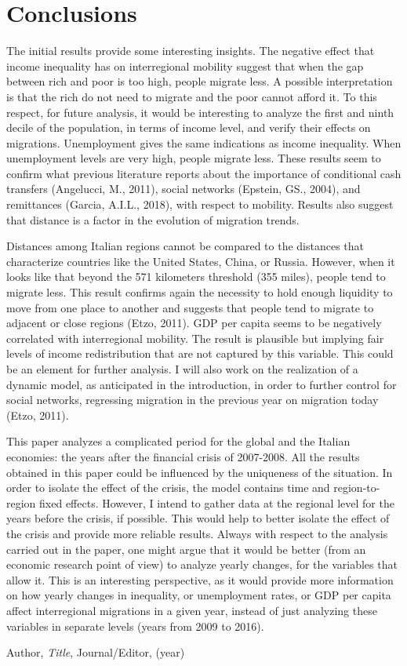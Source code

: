 \documentclass{article}
\theoremstyle{definition}
\theoremstyle{remark}
\begin{document}
 \section{Conclusions}
 The initial results provide some interesting insights. The negative effect that income inequality has on interregional mobility suggest that when the gap between rich and poor is too high, people migrate less. A possible interpretation is that the rich do not need to migrate and the poor cannot afford it. 
To this respect, for future analysis, it would be interesting to analyze the first and ninth decile of the population, in terms of income level, and verify their effects on migrations. Unemployment gives the same indications as income inequality. When unemployment levels are very high, people migrate less. These results seem to confirm what previous literature reports about the importance of conditional cash transfers (Angelucci, M., 2011), social networks (Epstein, GS., 2004), and remittances (Garcia, A.I.L., 2018), with respect to mobility. 
Results also suggest that distance is a factor in the evolution of migration trends. 

Distances among Italian regions cannot be compared to the distances that characterize countries like the United States, China, or Russia. However, when it looks like that beyond the 571 kilometers threshold (355 miles), people tend to migrate less. This result confirms again the necessity to hold enough liquidity to move from one place to another and suggests that people tend to migrate to adjacent or close regions (Etzo, 2011). 
GDP per capita seems to be negatively correlated with interregional mobility. The result is plausible but implying fair levels of income redistribution that are not captured by this variable. This could be an element for further analysis. 
I will also work on the realization of a dynamic model, as anticipated in the introduction, in order to further control for social networks, regressing migration in the previous year on migration today (Etzo, 2011). 

This paper analyzes a complicated period for the global and the Italian economies: the years after the financial crisis of 2007-2008. All the results obtained in this paper could be influenced by the uniqueness of the situation. In order to isolate the effect of the crisis, the model contains time and region-to-region fixed effects. However, I intend to gather data at the regional level for the years before the crisis, if possible. This would help to better isolate the effect of the crisis and provide more reliable results.
Always with respect to the analysis carried out in the paper, one might argue that it would be better (from an economic research point of view) to analyze yearly changes, for the variables that allow it. This is an interesting perspective, as it would provide more information on how yearly changes in inequality, or unemployment rates, or GDP per capita affect interregional migrations in a given year, instead of just analyzing these variables in separate levels (years from 2009 to 2016). 



\begin{thebibliography}{99}

 Author, \emph{Title}, Journal/Editor, (year)

\end{thebibliography}
\end{document}
